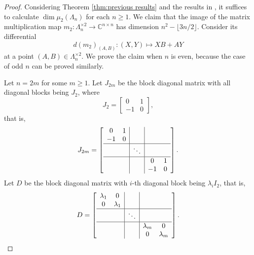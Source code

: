 \documentclass[reqno]{amsart}
\theoremstyle{definition}
\numberwithin{equation}{section}
\begin{document}
\begin{proof}
    Considering Theorem \ref{thm:previous results} and the results in \cite[Example 5.6]{ye2017new}, it suffices to calculate $\dim \mu_2(\Lambda_n)$ for each $n \geq 1$. We claim that the image of the matrix multiplication map $m_2:\Lambda_n^{\times 2} \rightarrow \mathbb{C}^{n \times n}$ has dimension $n^2-\lfloor 3n/2 \rfloor$. Consider its differential 
    \begin{equation*}
        d(m_2)_{(A,B)}:(X,Y) \mapsto XB+AY
    \end{equation*}
    at a point $(A,B) \in \Lambda_n^{\times 2}$. We prove the claim when $n$ is even, because the case of odd $n$ can be proved similarly. 
    
    Let $n=2m$ for some $m \geq 1$. Let $J_{2m}$ be the block diagonal matrix with all diagonal blocks being $J_2$, where
        \begin{equation*}
            J_2=\begin{bmatrix}
                0 & 1\\
                -1 & 0
            \end{bmatrix},
        \end{equation*}
        that is,
        \begin{equation*}
            J_{2m}=\left[\begin{array}{cc|c|cc}
                0 & 1 & & & \\
                -1 & 0 & & & \\ \hline
                & & \ddots & & \\ \hline
                & & & 0 & 1\\
                & & & -1  & 0
            \end{array}\right].
        \end{equation*}
        Let $D$ be the block diagonal matrix with $i$-th  diagonal block being $\lambda_i I_2$, that is,
        \begin{equation}\label{eq:diagonal matrix in the argument of skew-symmetric matrix structure}
            D=\left[\begin{array}{cc|c|cc}
                \lambda_1 & 0 & & & \\
                0 & \lambda_1 & & & \\ \hline
                & & \ddots & & \\ \hline
                & & & \lambda_m & 0\\
                & & & 0  & \lambda_m
            \end{array}\right].

\end{equation}
\end{proof}
\end{document}

